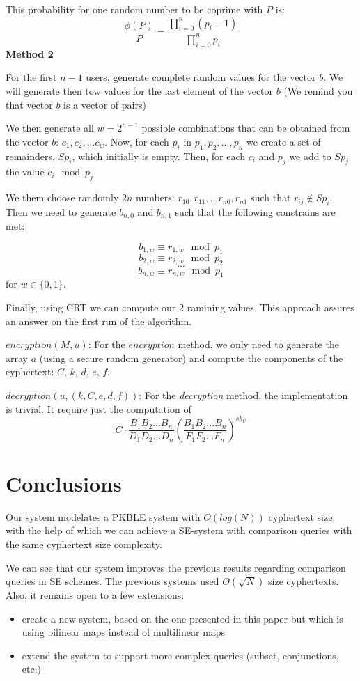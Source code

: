 \documentclass[a4paper, 12pt, oneside]{article}
\begin{document}
\bigskip
This probability for one random number to be coprime with $P$ is: \[
\frac{\phi(P)}{P} = \frac{\displaystyle \prod_{i=0}^n (p_i - 1)}{\displaystyle \prod_{i=0}^n p_i}\]
\bigskip
\textbf{Method 2}

For the first $n-1$ users, generate complete random values for the vector $b$. We will generate then tow values for the last element of the vector $b$ (We remind you that vector $b$ is a vector of pairs)

We then generate all $w=2^{n-1}$ possible combinations that can be obtained from the vector $b$: $c_1, c_2, ... c_w$.
Now, for each $p_i$ in $p_1,p_2, ..., p_n$ we create a set of remainders, $Sp_i$, which initially is empty. Then, for each $c_i$ and $p_j$ we add to $Sp_j$ the value $c_i \mod p_j$

\bigskip
We them choose randomly $2n$ numbers: $r_{10}, r_{11}, ... r_{n0}, r_{n1}$ such that $r_{ij} \notin Sp_i$. Then we need to generate $b_{n,0}$ and $b_{n, 1}$ such that the following constrains are met:

\[b_{1,w} \equiv r_{1, w} \mod p_1\]
\[b_{2,w} \equiv r_{2, w} \mod p_2 \]
\[...\]
\[b_{n,w} \equiv r_{n, w} \mod p_1 \]
for $w \in \{0, 1\}$.


\bigskip
Finally, using CRT we can compute our 2 ramining values.
This approach assures an answer on the first run of the algorithm.

\bigskip
$encryption(M, u)$:
For the $encryption$ method, we only need to generate the array $a$ (using a secure random generator) and compute the components of the cyphertext: $C$, $k$, $d$, $e$, $f$.


\bigskip
$decryption(u, (k, C, e, d, f))$:
For the \textit{decryption} method, the implementation is trivial. It require just the computation of 
\[C\cdot \frac{B_1B_2...B_n}{D_1D_2...D_n}\left(\frac{B_1B_2...B_n}{F_1F_2...F_n}\right)^{sk_U}\]


\newpage

\section{Conclusions}

Our system modelates a PKBLE system with $O(log(N))$ cyphertext size, with the help of which we can achieve a SE-system with comparison queries with the same cyphertext size complexity.

We can see that our system improves the previous results regarding comparison queries in SE schemes. The previous systems used $O(\sqrt{N})$ size cyphertexts. Also, it remains open to a few extensions: 
\begin{itemize}
\item create a new system, based on the one presented in this paper but which is using bilinear maps instead of multilinear maps
\item extend the system to support more complex queries (subset, conjunctions, etc.)
\end{itemize}
\end{document}
